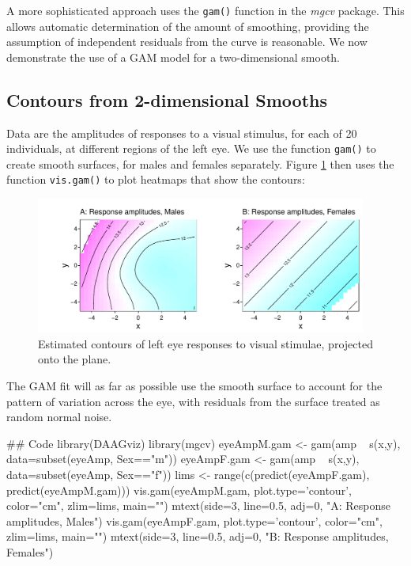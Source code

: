 \documentclass{tufte-book}\usepackage[]{graphicx}\usepackage[]{color}
\newcommand{\txtt}[1]{\texttt{#1}}
\begin{document}
A more sophisticated approach uses the \txtt{gam()} function
in the {\em mgcv} package.  This allows automatic determination of the
amount of smoothing, providing the assumption of independent residuals
from the curve is reasonable.  We now demonstrate the use of a GAM
model for a two-dimensional smooth.

\subsection{Contours from 2-dimensional Smooths}
Data are the amplitudes of responses to a visual stimulus, for each of
20 individuals, at different regions of the left eye.  We use the
function \txtt{gam()} to create smooth
surfaces, for males and females separately. Figure \ref{fig:visAmp}
then uses the function \txtt{vis.gam()} to plot heatmaps that show the
contours:
\begin{fullwidth}
\begin{figure}
\begin{Schunk}


\centerline{\includegraphics[width=0.97\textwidth]{figs/12-plotVIS-1} }

\end{Schunk}
\caption{Estimated contours of left eye responses to visual stimulae,
projected onto the plane.\label{fig:visAmp}}
\end{figure}
\end{fullwidth}
\enlargethispage{12pt}

The GAM fit will as far as possible use the smooth surface
to account for the pattern of variation across the eye, with
residuals from the surface treated as random normal noise.
\vspace*{24pt}

\begin{fullwidth}

\begin{Schunk}
\begin{Sinput}
## Code
library(DAAGviz)
library(mgcv)
eyeAmpM.gam <- gam(amp ~ s(x,y), data=subset(eyeAmp, Sex=="m"))
eyeAmpF.gam <- gam(amp ~ s(x,y), data=subset(eyeAmp, Sex=="f"))
lims <- range(c(predict(eyeAmpF.gam), predict(eyeAmpM.gam)))
vis.gam(eyeAmpM.gam, plot.type='contour', color="cm", zlim=lims, main="")
mtext(side=3, line=0.5, adj=0, "A: Response amplitudes, Males")
vis.gam(eyeAmpF.gam, plot.type='contour', color="cm", zlim=lims, main="")
mtext(side=3, line=0.5, adj=0, "B: Response amplitudes, Females")
\end{Sinput}
\end{Schunk}

\end{fullwidth}
\end{document}
